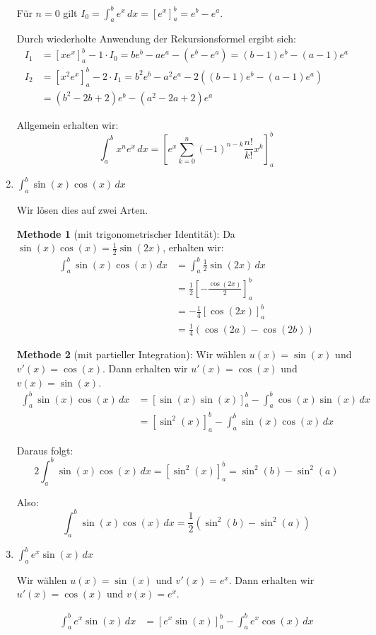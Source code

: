 \documentclass{article}
\begin{document}
\begin{enumerate}
Für $n = 0$ gilt $I_0 = \int_a^b e^x\,dx = [e^x]_a^b = e^b - e^a$.

Durch wiederholte Anwendung der Rekursionsformel ergibt sich:
\begin{align}
I_1 &= [xe^x]_a^b - 1 \cdot I_0 = be^b - ae^a - (e^b - e^a) = (b-1)e^b - (a-1)e^a\\
I_2 &= [x^2e^x]_a^b - 2 \cdot I_1 = b^2e^b - a^2e^a - 2((b-1)e^b - (a-1)e^a)\\
&= (b^2 - 2b + 2)e^b - (a^2 - 2a + 2)e^a
\end{align}

Allgemein erhalten wir:
$$\int_a^b x^n e^x\,dx = \left[e^x \sum_{k=0}^{n} (-1)^{n-k} \frac{n!}{k!} x^k\right]_a^b$$

\item $\int_a^b \sin(x)\cos(x)\,dx$

Wir lösen dies auf zwei Arten.

\textbf{Methode 1} (mit trigonometrischer Identität): 
Da $\sin(x)\cos(x) = \frac{1}{2}\sin(2x)$, erhalten wir:
\begin{align}
\int_a^b \sin(x)\cos(x)\,dx &= \int_a^b \frac{1}{2}\sin(2x)\,dx\\
&= \frac{1}{2} \left[-\frac{\cos(2x)}{2}\right]_a^b\\
&= -\frac{1}{4}[\cos(2x)]_a^b\\
&= \frac{1}{4}(\cos(2a) - \cos(2b))
\end{align}

\textbf{Methode 2} (mit partieller Integration):
Wir wählen $u(x) = \sin(x)$ und $v'(x) = \cos(x)$. Dann erhalten wir $u'(x) = \cos(x)$ und $v(x) = \sin(x)$.
\begin{align}
\int_a^b \sin(x)\cos(x)\,dx &= [\sin(x)\sin(x)]_a^b - \int_a^b \cos(x)\sin(x)\,dx\\
&= [\sin^2(x)]_a^b - \int_a^b \sin(x)\cos(x)\,dx
\end{align}

Daraus folgt:
$$2\int_a^b \sin(x)\cos(x)\,dx = [\sin^2(x)]_a^b = \sin^2(b) - \sin^2(a)$$

Also:
$$\int_a^b \sin(x)\cos(x)\,dx = \frac{1}{2}(\sin^2(b) - \sin^2(a))$$

\item $\int_a^b e^x\sin(x)\,dx$

Wir wählen $u(x) = \sin(x)$ und $v'(x) = e^x$. Dann erhalten wir $u'(x) = \cos(x)$ und $v(x) = e^x$.

\begin{align}
\int_a^b e^x\sin(x)\,dx &= [e^x\sin(x)]_a^b - \int_a^b e^x\cos(x)\,dx
\end{align}


\end{enumerate}
\end{document}
